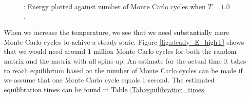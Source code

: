 \documentclass{article}
\begin{document}
{		\begin{figure}[H]
		\caption{: Energy plotted against number of Monte Carlo cycles when $T = 1.0$.}
		\label{fig:steady_E}
		\end{figure}

		When we increase the temperature, we see that we need substantially more Monte Carlo cycles to achive a steady state. Figure \ref{fig:steady_E_highT} shows that we would need around 1 million Monte Carlo cycles for both the random matrix and the matrix with all spins up. An estimate for the actual time it takes to reach equilibrium based on the number of Monte Carlo cycles can be made if we assume that one Monte Carlo cycle equals 1 second. The estimated equilibration times can be found in Table \ref{Tab:equilibration_times}.

}
\end{document}
